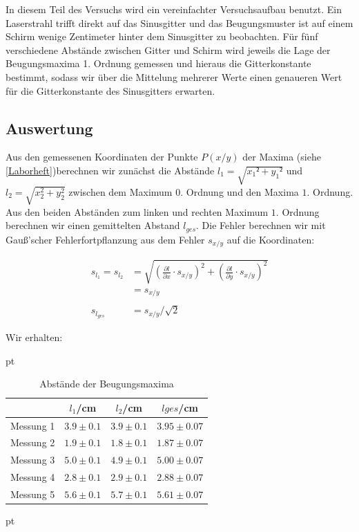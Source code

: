 \documentclass[12pt]{article}
\newcommand{\del}[2][]{\frac{\partial #1}{\partial #2}}
\begin{document}
In diesem Teil des Versuchs wird ein vereinfachter Versuchsaufbau benutzt. Ein Laserstrahl trifft direkt auf das Sinusgitter und das Beugungsmuster ist auf einem Schirm wenige Zentimeter hinter dem Sinusgitter zu beobachten. Für fünf verschiedene Abstände zwischen Gitter und Schirm wird jeweils die Lage der Beugungsmaxima 1. Ordnung gemessen und hieraus die Gitterkonstante bestimmt, sodass wir über die Mittelung mehrerer Werte einen genaueren Wert für die Gitterkonstante des Sinusgitters erwarten.



\newpage
\subsection{Auswertung}

Aus den gemessenen Koordinaten der Punkte $P(x/y)$ der Maxima (siehe \ref{Laborheft})berechnen wir zunächst die Abstände $l_1 = \sqrt{x_1²+y_1²}$ und $l_2= \sqrt{x_2^2+y_2^2} $ zwischen dem Maximum $0.$ Ordnung und den Maxima $1.$ Ordnung. Aus den beiden Abständen zum linken und rechten Maximum $1.$ Ordnung berechnen wir einen gemittelten Abstand $l_{ges}$. Die Fehler berechnen wir mit Gauß'scher Fehlerfortpflanzung aus dem Fehler $s_{x/y}$ auf die Koordinaten:

\begin{align*}
s_{l_1} = s_{l_2} &= \sqrt{\left(\del[l]{x}\cdot s_{x/y}\right)^2+\left(\del[l]{y}\cdot s_{x/y}\right)^2}\\
&= s_{x/y}\\
\  \\
s_{l_{ges}} &= s_{x/y}/\sqrt{2}
\end{align*}

Wir erhalten:

  pt
 \begin{table}[h!]
 {\centering{}
\begin{tabular}{c||c|c|c}
 					& $l_1$/cm 	& $l_2$/cm & $l{ges}$/cm	\\ \hline\hline
Messung 1		& $3.9 \pm 0.1$ 	&  $3.9 \pm 0.1$    	&  $3.95 \pm 0.07$ \\ \hline 
Messung 2	&	 $1.9 \pm 0.1$ 	   	&  $1.8 \pm 0.1$  	&  $1.87 \pm 0.07$  \\ \hline
Messung 3      	&  $5.0 \pm 0.1$  	&  $4.9 \pm 0.1$  &  $5.00 \pm 0.07$  \\ \hline
Messung 4    & $2.8 \pm 0.1$ & $2.9 \pm 0.1$ &   $2.88 \pm 0.07$        \\ \hline                                           
Messung 5  & $5.6 \pm 0.1$  & $5.7 \pm 0.1$ & $5.61 \pm 0.07$
 \end{tabular}}
 \caption{Abstände der Beugungsmaxima}
\end{table}
 pt
\end{document}
